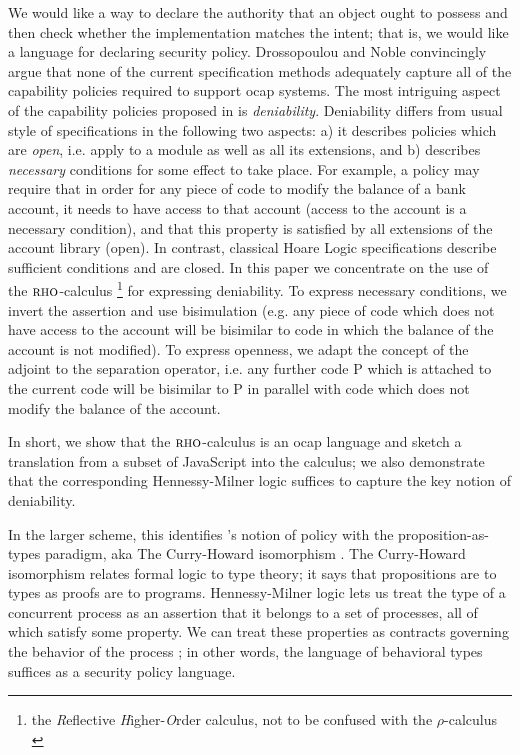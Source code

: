 \documentclass[]{acm_proc_article-sp}
\numberwithin{equation}{subsection}
\newcommand{\rhoc}{${\textsc{rho}}$-calculus}
\begin{document}
We would like a way to declare the authority that an object ought to
possess and then check whether the implementation matches the intent;
that is, we would like a language for declaring security policy.
Drossopoulou and Noble \cite{Drossopoulou:2013:NCP:2489804.2489811}
convincingly argue that none of the current specification methods
adequately capture all of the capability policies required to support
ocap systems. The most intriguing aspect of the capability policies
proposed in \cite{Drossopoulou:2013:NCP:2489804.2489811} is {\em
  deniability}. Deniability differs from usual style of specifications
in the following two aspects: a) it describes policies which are {\em
  open}, i.e. apply to a module as well as all its extensions, and b)
describes {\em necessary} conditions for some effect to take
place. For example, a policy may require that in order for any piece
of code to modify the balance of a bank account, it needs to have
access to that account (access to the account is a necessary
condition), and that this property is satisfied by all extensions of
the account library (open). In contrast, classical Hoare Logic
specifications \cite{Hoare:1969:ABC:363235.363259} describe sufficient
conditions and are closed.  In this paper we concentrate on the use of
the {\rhoc} \cite{DBLP:conf/tgc/MeredithR05} \footnote{the
  \emph{R}eflective \emph{H}igher-\emph{O}rder calculus, not to
  be confused with the $\rho$-calculus
  \cite{CirsteaFaureKirchnerWLRA2004}} for expressing deniability. To
express necessary conditions, we invert the assertion and use
bisimulation (e.g. any piece of code which does not have access to the
account will be bisimilar to code in which the balance of the account
is not modified). To express openness, we adapt the concept of the
adjoint to the separation operator, i.e. any further code P which is
attached to the current code will be bisimilar to P in parallel with
code which does not modify the balance of the account.

In short, we show that the \rhoc\; is an ocap language and sketch a
translation from a subset of JavaScript into the calculus; we also
demonstrate that the corresponding Hennessy-Milner logic suffices to
capture the key notion of deniability.

In the larger scheme, this identifies
\cite{Drossopoulou:2013:NCP:2489804.2489811}'s notion of policy with
the proposition-as-types paradigm, aka The Curry-Howard isomorphism
\cite{Abramsky:1992:PP:194588.194591}
\cite{Krivine-TheCurryHowardCorre}. The Curry-Howard isomorphism
relates formal logic to type theory; it says that propositions are to
types as proofs are to programs.  Hennessy-Milner logic lets us treat
the type of a concurrent process as an assertion that it belongs to a
set of processes, all of which satisfy some property.  We can treat
these properties as contracts governing the behavior of the process
\cite{Meredith:2003:CT:944217.944236}; in other words, the language of
behavioral types suffices as a security policy language.
\end{document}
